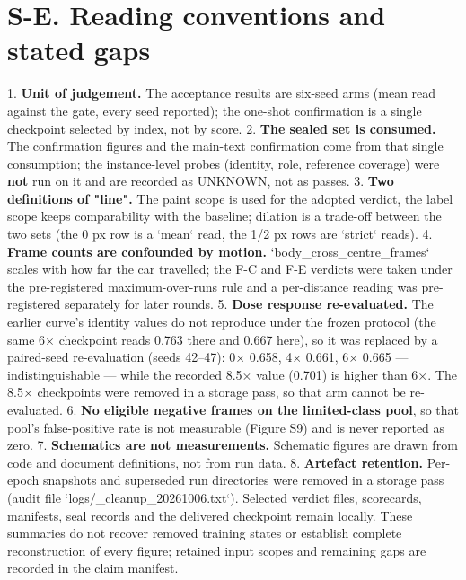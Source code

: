 \documentclass[journal]{IEEEtran}
\begin{document}
\section*{S-E. Reading conventions and stated gaps}
1. \textbf{Unit of judgement.} The acceptance results are six-seed arms (mean read against the gate, every
   seed reported); the one-shot confirmation is a single checkpoint selected by index, not by score.
2. \textbf{The sealed set is consumed.} The confirmation figures and the main-text confirmation come from that
   single consumption; the instance-level probes (identity, role, reference coverage) were \textbf{not} run on it
   and are recorded as UNKNOWN, not as passes.
3. \textbf{Two definitions of "line".} The paint scope is used for the adopted verdict, the label scope
   keeps comparability with the baseline; dilation is a trade-off between the two sets (the 0 px row
   is a `mean` read, the 1/2 px rows are `strict` reads).
4. \textbf{Frame counts are confounded by motion.} `body_cross_centre_frames` scales with how far the car
   travelled; the F-C and F-E verdicts were taken under the pre-registered maximum-over-runs rule and
   a per-distance reading was pre-registered separately for later rounds.
5. \textbf{Dose response re-evaluated.} The earlier curve's identity values do not reproduce under the frozen
   protocol (the same 6$\times$ checkpoint reads 0.763 there and 0.667 here), so it was replaced by a paired-seed
   re-evaluation (seeds 42--47): 0$\times$ 0.658, 4$\times$ 0.661, 6$\times$ 0.665 --- indistinguishable --- while the recorded 8.5$\times$
   value (0.701) is higher than 6$\times$. The 8.5$\times$ checkpoints were removed in a storage pass, so that arm cannot
   be re-evaluated.
6. \textbf{No eligible negative frames on the limited-class pool}, so that pool's false-positive rate is
   not measurable (Figure S9) and is never reported as zero.
7. \textbf{Schematics are not measurements.} Schematic figures are drawn from code and document
   definitions, not from run data.
8. \textbf{Artefact retention.} Per-epoch snapshots and superseded run directories were removed in a
   storage pass (audit file `logs/_cleanup_20261006.txt`). Selected verdict files, scorecards,
   manifests, seal records and the delivered checkpoint remain locally. These summaries do not
   recover removed training states or establish complete reconstruction of every figure;
   retained input scopes and remaining gaps are recorded in the claim manifest.
\end{document}
